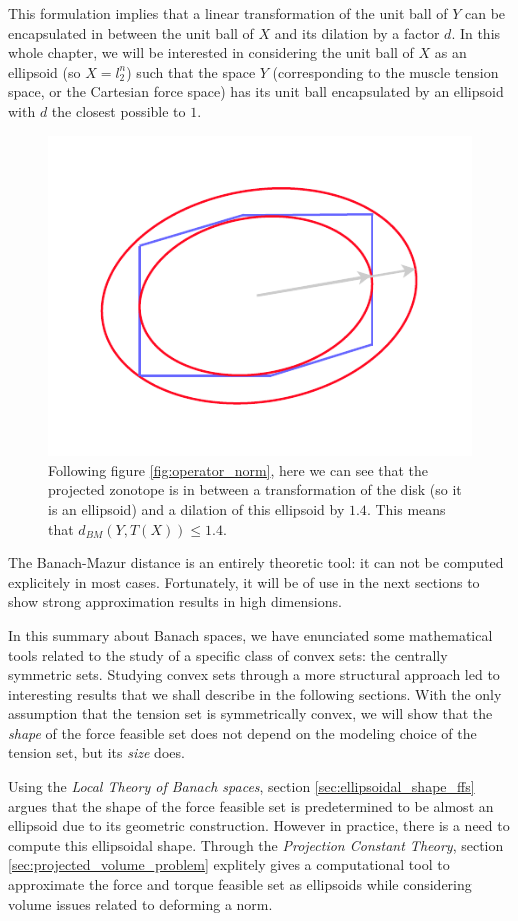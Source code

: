 This formulation implies that a linear transformation of the unit ball of $Y$ can be encapsulated in between the unit ball of $X$ and its dilation by a factor $d$. In this whole chapter, we will be interested in considering the unit ball of $X$ as an ellipsoid (so $X = l_2^n$) such that the space $Y$ (corresponding to the muscle tension space, or the Cartesian force space) has its unit ball encapsulated by an ellipsoid with $d$ the closest possible to $1$.  

\begin{figure}[!htb]
    \captionsetup{justification=centering}
        \centering
        \includegraphics[trim={0 25 0 25},clip, width=0.5\linewidth]{img/chapter_3/banachmazurdvoretzky.pdf}
    \caption{Following figure \ref{fig:operator_norm}, here we can see that the projected zonotope is in between a transformation of the disk (so it is an ellipsoid) and a dilation of this ellipsoid by $1.4$. This means that $d_{BM}(Y, T(X)) \leq 1.4$.}
    \label{fig:banach_mazur_example}
\end{figure}

The Banach-Mazur distance is an entirely theoretic tool: it can not be computed explicitely in most cases. Fortunately, it will be of use in the next sections to show strong approximation results in high dimensions.

In this summary about Banach spaces, we have enunciated some mathematical tools related to the study of a specific class of convex sets: the centrally symmetric sets. Studying convex sets through a more structural approach led to interesting results that we shall describe in the following sections. With the only assumption that the tension set is symmetrically convex, we will show that the \emph{shape} of the force feasible set does not depend on the modeling choice of the tension set, but its \emph{size} does.

Using the \emph{Local Theory of Banach spaces}, section \ref{sec:ellipsoidal_shape_ffs} argues that the shape of the force feasible set is predetermined to be almost an ellipsoid due to its geometric construction. However in practice, there is a need to compute this ellipsoidal shape. Through the \emph{Projection Constant Theory}, section \ref{sec:projected_volume_problem} explitely gives a computational tool to approximate the force and torque feasible set as ellipsoids while considering volume issues related to deforming a norm.

